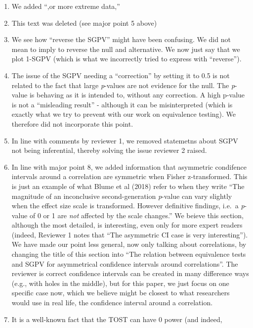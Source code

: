 \documentclass[man]{apa6}
\begin{document}
\begin{enumerate}
\def\labelenumi{\arabic{enumi}.}
\item
  We added \enquote{,or more extreme data,}
\item
  This text was deleted (see major point 5 above)
\item
  We see how \enquote{reverse the SGPV} might have been confusing. We
  did not mean to imply to reverse the null and alternative. We now just
  say that we plot 1-SGPV (which is what we incorrectly tried to express
  with \enquote{reverse}).
\item
  The issue of the SGPV needing a \enquote{correction} by setting it to
  0.5 is not related to the fact that large \emph{p}-values are not
  evidence for the null. The \emph{p}-value is behaving as it is
  intended to, without any correction. A high p-value is not a
  \enquote{misleading result} - although it can be misinterpreted (which
  is exactly what we try to prevent with our work on equivalence
  testing). We therefore did not incorporate this point.
\item
  In line with comments by reviewer 1, we removed statemetns about SGPV
  not being inferential, thereby solving the issue reviewer 2 raised.
\item
  In line with major point 8, we added information that asymmetric
  condifence intervals around a correlation are symmetric when Fisher
  z-transformed. This is just an example of what Blume et al (2018)
  refer to when they write \enquote{The magnitude of an inconclusive
  second-generation \emph{p}-value can vary slightly when the effect
  size scale is transformed. However definitive findings, i.e.~a
  \emph{p}-value of 0 or 1 are \emph{not} affected by the scale
  changes.} We beieve this section, although the most detailed, is
  interesting, even only for more expert readers (indeed, Reviewer 1
  notes that \enquote{The asymmetric CI case is very interesting}). We
  have made our point less general, now only talking about correlations,
  by changing the title of this section into \enquote{The relation
  between equivalence tests and SGPV for asymmetrical confidence
  intervals around correlations}. The reviewer is correct confidence
  intervals can be created in many difference ways (e.g., with holes in
  the middle), but for this paper, we just focus on one specific case
  now, which we believe might be closest to what researchers would use
  in real life, the confidence interval around a correlation.
\item
  It is a well-known fact that the TOST can have 0 power (and indeed,

\end{enumerate}
\end{document}
